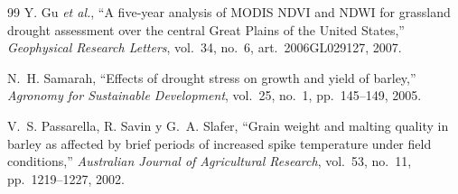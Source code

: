 \begin{thebibliography}{99}
Y. Gu \emph{et al.}, ``A five‐year analysis of MODIS NDVI and NDWI for grassland drought assessment over the central Great Plains of the United States,'' \emph{Geophysical Research Letters}, vol.~34, no.~6, art.~2006GL029127, 2007.

N.~H. Samarah, ``Effects of drought stress on growth and yield of barley,'' \emph{Agronomy for Sustainable Development}, vol.~25, no.~1, pp.~145--149, 2005.

V.~S. Passarella, R. Savin y G.~A. Slafer, ``Grain weight and malting quality in barley as affected by brief periods of increased spike temperature under field conditions,'' \emph{Australian Journal of Agricultural Research}, vol.~53, no.~11, pp.~1219--1227, 2002.

\end{thebibliography}
